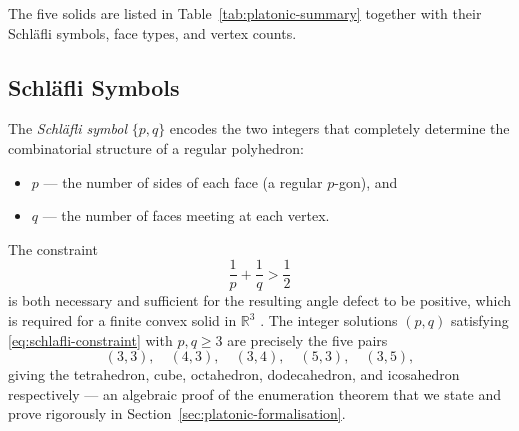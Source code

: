 The five solids are listed in Table~\ref{tab:platonic-summary} together with
their Schläfli symbols, face types, and vertex counts.

\begin{table}[ht]
\centering
\caption{The five Platonic solids and their basic combinatorial data.}
\label{tab:platonic-summary}
\end{table}

\subsection{Schläfli Symbols}
\label{subsec:schlafli}

The \emph{Schläfli symbol} $\{p,q\}$ encodes the two integers that
completely determine the combinatorial structure of a regular polyhedron:
\begin{itemize}
  \item $p$ — the number of sides of each face (a regular $p$-gon), and
  \item $q$ — the number of faces meeting at each vertex.
\end{itemize}
The constraint
\begin{equation}
  \frac{1}{p} + \frac{1}{q} > \frac{1}{2}
  \label{eq:schlafli-constraint}
\end{equation}
is both necessary and sufficient for the resulting angle defect to be positive,
which is required for a finite convex solid in $\mathbb{R}^{3}$
\cite{coxeter_regular_polytopes}.  The integer solutions $(p,q)$ satisfying
\eqref{eq:schlafli-constraint} with $p,q \geq 3$ are precisely the five pairs
\[
  (3,3),\quad (4,3),\quad (3,4),\quad (5,3),\quad (3,5),
\]
giving the tetrahedron, cube, octahedron, dodecahedron, and icosahedron
respectively — an algebraic proof of the enumeration theorem that we state and
prove rigorously in Section~\ref{sec:platonic-formalisation}.

